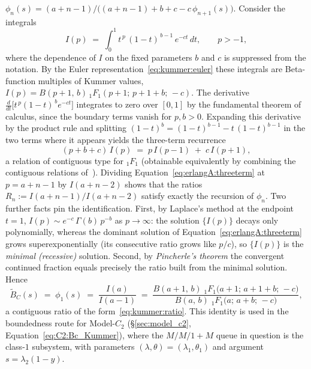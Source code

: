 $\phi_n(s)=(a+n-1)\big/\bigl((a+n-1)+b+c-c\,\phi_{n+1}(s)\bigr)$. Consider the integrals
\begin{equation*}
    I(p) \;=\; \int_0^1 t^{\,p}\,(1-t)^{\,b-1}\,e^{-ct}\,dt,
    \qquad p>-1,
\end{equation*}
where the dependence of $I$ on the fixed parameters $b$ and $c$ is suppressed from the
notation. By the Euler representation~\eqref{eq:kummer:euler} these integrals are
Beta-function multiples of Kummer values, $I(p)=B(p+1,\,b)\,{}_1F_1(p+1;\,p+1+b;\,-c)$.
The derivative $\frac{d}{dt}\bigl[t^{\,p}(1-t)^{\,b}e^{-ct}\bigr]$ integrates to zero
over $[0,1]$ by the fundamental theorem of calculus, since the boundary terms vanish for
$p,b>0$. Expanding this derivative by the product rule and splitting
$(1-t)^{b}=(1-t)^{b-1}-t\,(1-t)^{b-1}$ in the two terms where it appears yields the
three-term recurrence
\begin{equation}
    (p+b+c)\,I(p) \;=\; p\,I(p-1) \;+\; c\,I(p+1),
    \label{eq:erlangA:threeterm}
\end{equation}
a relation of contiguous type for ${}_1F_1$ (obtainable equivalently by combining the
contiguous relations of~\cite[\S13.3]{dlmf}). Dividing Equation~\eqref{eq:erlangA:threeterm} at
$p=a+n-1$ by $I(a+n-2)$ shows that the ratios $R_n:=I(a+n-1)/I(a+n-2)$ satisfy exactly
the recursion of $\phi_n$. Two further facts pin the identification. First, by
Laplace's method at the endpoint $t=1$, $I(p)\sim e^{-c}\,\Gamma(b)\,p^{-b}$ as
$p\to\infty$: the solution $\{I(p)\}$ decays only polynomially, whereas the dominant
solution of Equation~\eqref{eq:erlangA:threeterm} grows superexponentially (its consecutive
ratio grows like $p/c$), so $\{I(p)\}$ is the \emph{minimal (recessive)} solution.
Second, by \emph{Pincherle's theorem} the convergent continued fraction equals
precisely the ratio built from the minimal solution. Hence
\begin{equation}
    \widetilde{B}_C(s)\;=\;\phi_1(s)\;=\;\frac{I(a)}{I(a-1)}
    \;=\;\frac{B(a+1,\,b)\;{}_1F_1\bigl(a+1;\,a+1+b;\,-c\bigr)}
              {B(a,\,b)\;{}_1F_1\bigl(a;\,a+b;\,-c\bigr)},
    \label{eq:erlangA:cf_kummer}
\end{equation}
a contiguous ratio of the form~\eqref{eq:kummer:ratio}. This identity is used in the
boundedness route for Model-$C_2$ (\S\ref{sec:model_c2}, Equation~\eqref{eq:C2:Bc_Kummer}),
where the $M/M/1+M$ queue in question is the class-$1$ subsystem, with parameters
$(\lambda,\theta)=(\lambda_1,\theta_1)$ and argument $s=\lambda_2(1-y)$.

